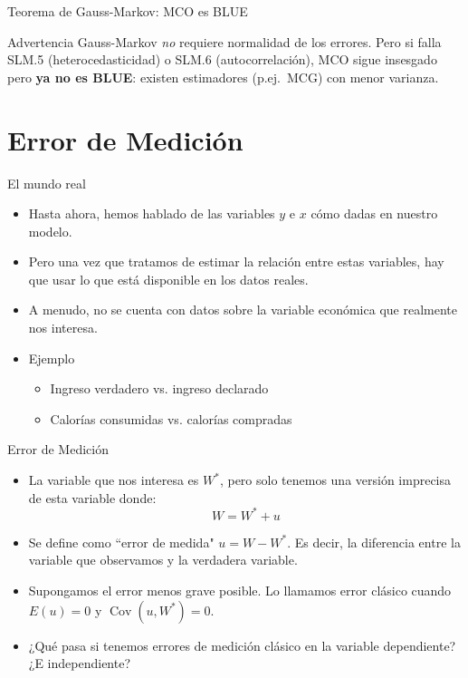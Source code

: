 \documentclass[10pt]{beamer}
\begin{document}
\begin{frame}[allowframebreaks]{Teorema de Gauss-Markov: MCO es BLUE}
\begin{block}{Advertencia}
Gauss-Markov \emph{no} requiere normalidad de los errores. Pero si falla SLM.5 (heterocedasticidad) o SLM.6 (autocorrelación), MCO sigue insesgado pero \textbf{ya no es BLUE}: existen estimadores (p.ej.\ MCG) con menor varianza.
\end{block}

\end{frame}


\section{Error de Medición}

\begin{frame}{El mundo real}
    \begin{itemize}
        \item Hasta ahora, hemos hablado de las variables $y$ e $x$ cómo dadas en nuestro modelo.
        \item Pero una vez que tratamos de estimar la relación entre estas variables, hay que usar lo que está disponible en los datos reales.
        \item A menudo, no se cuenta con datos sobre la variable económica que realmente nos interesa.
        \item Ejemplo
        \begin{itemize}
            \item Ingreso verdadero vs. ingreso declarado
            \item Calor\'ias consumidas vs. calor\'ias compradas
        \end{itemize}

    \end{itemize}
\end{frame}

\begin{frame}{Error de Medición}
    \begin{itemize}
        \item La variable que nos interesa es $W^{*}$, pero solo tenemos una versión imprecisa de esta variable donde:
$$
W=W^{*}+u
$$
\item Se define como ``error de medida" $u=W-W^{*}$. Es decir, la diferencia entre la variable que observamos y la verdadera variable.
\item Supongamos el error menos grave posible. Lo llamamos error cl\'asico cuando $E(u)=0$ y $\operatorname{Cov}(u, W^{*})=0$.
\item ¿Qué pasa si tenemos errores de medición cl\'asico en la variable dependiente? ¿E independiente?
    \end{itemize}
\end{frame}
\end{document}
